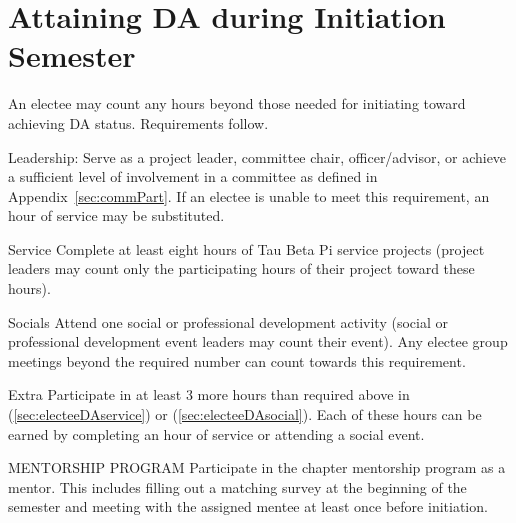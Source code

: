 \section{Attaining DA during Initiation Semester} An electee may count any hours beyond those needed for initiating toward achieving DA status. Requirements follow.
\begin{enumsubsection}
\item{Leadership:} Serve as a project leader, committee chair,  officer/advisor, or achieve a sufficient level of involvement in a committee as defined in Appendix~\ref{sec:commPart}. If an electee is unable to meet this requirement, an hour of service may be substituted.
\item{Service}\label{sec:electeeDAservice} Complete at least eight hours of Tau Beta Pi service projects (project leaders may count only the participating hours of their project toward these hours). 
\item{Socials} \label{sec:electeeDAsocial} Attend one social or professional development activity (social or professional development event leaders may count their event). Any electee group meetings beyond the required number can count towards this requirement.
\item{Extra} Participate in at least 3 more hours than required above in (\ref{sec:electeeDAservice}) or (\ref{sec:electeeDAsocial}). Each of these hours can be earned by completing an hour of service or attending a social event.
\item{MENTORSHIP PROGRAM} Participate in the chapter mentorship program as a mentor. This includes filling out a matching survey at the beginning of the semester and meeting with the assigned mentee at least once before initiation.

\end{enumsubsection}
